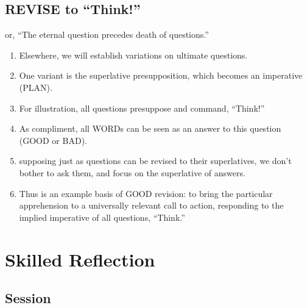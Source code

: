 \documentclass[
]{book}
\providecommand{\tightlist}{%
  \setlength{\itemsep}{0pt}\setlength{\parskip}{0pt}}
\begin{document}
\hypertarget{revise-to-think}{%
\subsection{REVISE to ``Think!''}\label{revise-to-think}}

or, ``The eternal question precedes death of questions.''

\begin{enumerate}
\def\labelenumi{\arabic{enumi}.}
\tightlist
\item
  Elsewhere, we will establish variations on ultimate questions.
\item
  One variant is the superlative presupposition, which becomes an imperative (PLAN).
\item
  For illustration, all questions presuppose and command, ``Think!''
\item
  As compliment, all WORDs can be seen as an answer to this question (GOOD or BAD).
\item
  supposing just as questions can be revised to their superlatives,
  we don't bother to ask them, and focus on the superlative of answers.
\item
  Thus is an example basis of GOOD revision: to bring the particular apprehension to a universally relevant call to action, responding to the implied imperative of all questions, ``Think.''
\end{enumerate}

\hypertarget{skilled-reflection}{%
\section{Skilled Reflection}\label{skilled-reflection}}

\hypertarget{session}{%
\subsection{Session}\label{session}}
\end{document}
